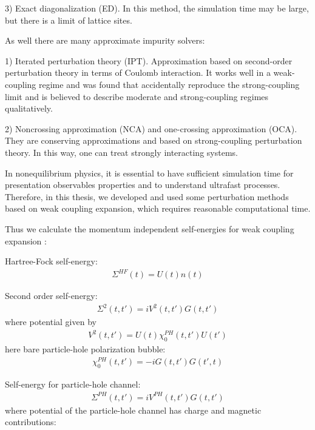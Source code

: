 3) Exact diagonalization (ED)\citep{PhysRevB.88.235106,PhysRevB.91.045136}. In this method, the simulation time may be large, but there is a limit of lattice sites.

As well there are many approximate impurity solvers:

1) Iterated perturbation theory (IPT)\citep{PhysRevLett.107.186406, PhysRevB.81.115131,PhysRevB.88.165115, PhysRevB.91.245153}. Approximation based on second-order perturbation theory in terms of Coulomb interaction. It works well in a weak-coupling regime and was found that accidentally reproduce the strong-coupling limit and is believed to describe moderate and strong-coupling regimes qualitatively.

2) Noncrossing approximation (NCA)\citep{PhysRevB.49.11040, PhysRevB.82.115115} and 
one-crossing approximation (OCA)\citep{PhysRevB.92.195123, PhysRevB.99.045118}. They are conserving approximations and based on strong-coupling perturbation theory. In this way, one can treat strongly interacting systems.

In nonequilibrium physics, it is essential to have sufficient simulation time for presentation observables properties and to understand ultrafast processes. Therefore, in this thesis, we developed and used some perturbation methods based on weak coupling expansion, which requires reasonable computational time. 

Thus we calculate the momentum independent self-energies for weak coupling expansion \citep{1989AnPhy.193..206B}:

{Hartree-Fock self-energy}:
\begin{align}
\label{HF_single_band}
\Sigma^{HF}(t)=U(t)n(t)
\end{align}

{Second order self-energy}:
\begin{align}
\label{S2_single_band}
\Sigma^{2}(t,t')=i V^2(t,t')G(t,t') 
\end{align}
where potential given by
\begin{align}
\label{V2_single_band}
V^2(t,t')=U(t)\chi^{PH}_0(t,t')U(t')
\end{align}
here bare particle-hole polarization bubble:
\begin{align}
\label{chi02_single_band}
\chi^{PH}_0(t,t')=-iG(t,t')G(t',t)
\end{align}

{Self-energy for particle-hole channel}:
\begin{align}
\label{Sph_single_band}
\Sigma^{PH}(t,t')=iV^{PH}(t,t')G(t,t')
\end{align}
where potential of the particle-hole channel has charge and magnetic contributions:

